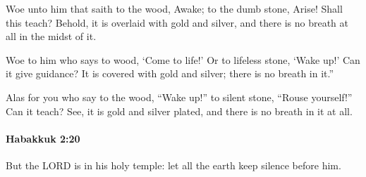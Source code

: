 			\begin{versebox}
					\item[BHS] 
					\item[LXX] 
					\item[ASV] Woe unto him that saith to the wood, Awake; to the dumb stone, Arise! Shall this teach? Behold, it is overlaid with gold and silver, and there is no breath at all in the midst of it.
					\item[NIV] Woe to him who says to wood, ‘Come to life!’ Or to lifeless stone, ‘Wake up!’ Can it give guidance? It is covered with gold and silver; there is no breath in it.”
					\item[NRSV] Alas for you who say to the wood, “Wake up!” to silent stone, “Rouse yourself!” Can it teach? See, it is gold and silver plated, and there is no breath in it at all.
			\end{versebox}

		\paragraph{Habakkuk 2:20} %
			\label{HABAKKUK-2-20}

			But the LORD is in his holy temple: let all the earth keep silence before him.

